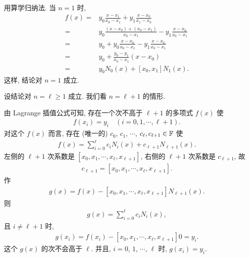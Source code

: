\begin{pf}
    用算学归纳法. 当 $n=1$ 时,
    \begin{align*}
        f(x)
        = {} & y_0 \frac{x - x_1}{x_0 - x_1}
        + y_1 \frac{x - x_0}{x_1 - x_0}                      \\
        = {} & y_0 \frac{(x - x_0) + (x_0 - x_1)}{x_0 - x_1}
        - y_1 \frac{x - x_0}{x_0 - x_1}                      \\
        = {} & y_0 + y_0 \frac{x - x_0}{x_0 - x_1}
        - y_1 \frac{x - x_0}{x_0 - x_1}                      \\
        = {} & y_0 + \frac{y_0 - y_1}{x_0 - x_1} (x - x_0)   \\
        = {} & y_0 N_0 (x) + [x_0, x_1] N_1 (x).
    \end{align*}
    这样, 结论对 $n=1$ 成立.

    设结论对 $n = \ell \geq 1$ 成立. 我们看 $n = \ell + 1$ 的情形.

    由 Lagrange 插值公式可知, 存在一个次不高于 $\ell + 1$ 的多项式 $f(x)$ 使
    \begin{align*}
        f(x_i) = y_i \quad (i = 0,1,\cdots,\ell + 1).
    \end{align*}
    对这个 $f(x)$ 而言, 存在 (唯一的) $c_0$, $c_1$, $\cdots$, $c_{\ell}, c_{\ell + 1} \in \mathbb{F}$ 使
    \begin{align*}
        f(x) = \sum_{i = 0}^{\ell} c_i N_{i} (x) + c_{\ell + 1} N_{\ell + 1} (x).
    \end{align*}
    左侧的 $\ell + 1$ 次系数是 $[x_0, x_1, \cdots, x_\ell, x_{\ell + 1}]$, 右侧的 $\ell + 1$ 次系数是 $c_{\ell + 1}$, 故
    \begin{align*}
        c_{\ell + 1} = [x_0, x_1, \cdots, x_\ell, x_{\ell + 1}].
    \end{align*}
    作
    \begin{align*}
        g(x) = f(x) - [x_0, x_1, \cdots, x_\ell, x_{\ell + 1}] N_{\ell + 1} (x).
    \end{align*}
    则
    \begin{align*}
        g(x) = \sum_{i = 0}^{\ell} c_i N_{i} (x),
    \end{align*}
    且 $i \neq \ell + 1$ 时,
    \begin{align*}
        g(x_i) = f(x_i) - [x_0, x_1, \cdots, x_\ell, x_{\ell + 1}] 0 = y_i.
    \end{align*}
    这个 $g(x)$ 的次不会高于 $\ell$. 并且, $i = 0$, $1$, $\cdots$, $\ell$ 时, $g(x_i) = y_i$.


\end{pf}
